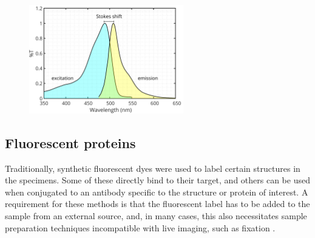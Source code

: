   \begin{figure}
    \centering
    \includegraphics[width=0.6\textwidth]{spectrum/egfp}
    \label{fig:spectrum}
  \end{figure}



  \subsection{Fluorescent proteins}
    Traditionally, synthetic fluorescent dyes were used to label certain structures in the specimens. Some of these directly bind to their target,
    and others can be used when conjugated to an antibody specific to the structure or protein of interest. A requirement for these methods is that the fluorescent label has to be added to the sample from an external source, and, in many cases, this also necessitates sample preparation techniques incompatible with live imaging, such as fixation \cite{bacallao_guiding_1990}.

